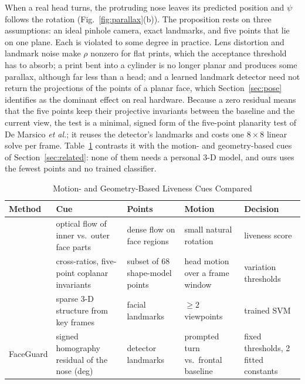 \documentclass{ieeeaccess}
\begin{document}
When a real head turns, the protruding nose leaves its predicted position and $\psi$ follows the rotation (Fig.~\ref{fig:parallax}(b)). The proposition rests on three assumptions: an ideal pinhole camera, exact landmarks, and five points that lie on one plane. Each is violated to some degree in practice. Lens distortion and landmark noise make $\rho$ nonzero for flat prints, which the acceptance threshold has to absorb; a print bent into a cylinder is no longer planar and produces some parallax, although far less than a head; and a learned landmark detector need not return the projections of the points of a planar face, which Section~\ref{sec:pose} identifies as the dominant effect on real hardware. Because a zero residual means that the five points keep their projective invariants between the baseline and the current view, the test is a minimal, signed form of the five-point planarity test of De Marsico \emph{et al.}; it reuses the detector's landmarks and costs one $8\times8$ linear solve per frame. Table~\ref{tab:geo} contrasts it with the motion- and geometry-based cues of Section~\ref{sec:related}: none of them needs a personal 3-D model, and ours uses the fewest points and no trained classifier.

\begin{table}[!t]
\centering
\caption{Motion- and Geometry-Based Liveness Cues Compared}
\label{tab:geo}
\footnotesize
\setlength{\tabcolsep}{2pt}
\begin{tabular}{@{}>{\raggedright\arraybackslash}p{1.25cm}>{\raggedright\arraybackslash}p{2.05cm}>{\raggedright\arraybackslash}p{1.55cm}>{\raggedright\arraybackslash}p{1.55cm}>{\raggedright\arraybackslash}p{1.3cm}@{}}
\toprule
Method & Cue & Points & Motion & Decision \\
\midrule
{}\cite{kollreider2007motion} & optical flow of inner vs.\ outer face parts & dense flow on face regions & small natural rotation & liveness score \\
{}\cite{demarsico2012projective} & cross-ratios, five-point coplanar invariants & subset of 68 shape-model points & head motion over a frame window & variation thresholds \\
{}\cite{wang2013structure} & sparse 3-D structure from key frames & facial landmarks & ${\ge}2$ viewpoints & trained SVM \\
FaceGuard & signed homography residual of the nose (deg) & 5 detector landmarks & prompted turn vs.\ frontal baseline & fixed thresholds, 2 fitted constants \\
\bottomrule
\end{tabular}
\end{table}
\end{document}
